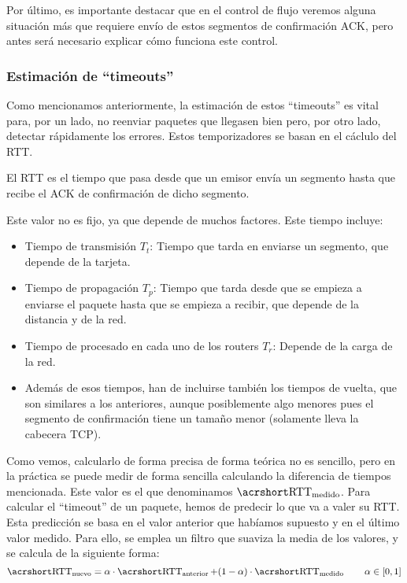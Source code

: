 Por último, es importante destacar que en el control de flujo veremos alguna situación más que requiere envío de estos segmentos de confirmación \acrshort{ACK}, pero antes será necesario explicar cómo funciona este control.

\subsubsection{Estimación de ``timeouts''}

Como mencionamos anteriormente, la estimación de estos ``timeouts'' es vital para, por un lado, no reenviar paquetes que llegasen bien pero, por otro lado, detectar rápidamente los errores. Estos temporizadores se basan en el cáclulo del \acrshort{RTT}.

\begin{definicion}
    El \acrfull{RTT} es el tiempo que pasa desde que un emisor envía un segmento hasta que recibe el \acrshort{ACK} de confirmación de dicho segmento.
\end{definicion}

Este valor no es fijo, ya que depende de muchos factores. Este tiempo incluye:
\begin{itemize}
    \item Tiempo de transmisión $T_t$: Tiempo que tarda en enviarse un segmento, que depende de la tarjeta.
    \item Tiempo de propagación $T_p$: Tiempo que tarda desde que se empieza a enviarse el paquete hasta que se empieza a recibir, que depende de la distancia y de la red.
    \item Tiempo de procesado en cada uno de los routers $T_r$: Depende de la carga de la red.
    \item Además de esos tiempos, han de incluirse también los tiempos de vuelta, que son similares a los anteriores, aunque posiblemente algo menores pues el segmento de confirmación tiene un tamaño menor (solamente lleva la cabecera \acrshort{TCP}).
\end{itemize}

Como vemos, calcularlo de forma precisa de forma teórica no es sencillo, pero en la práctica se puede medir de forma sencilla calculando la diferencia de tiempos mencionada. Este valor es el que denominamos $\rtt_{\text{medido}}$. Para calcular el ``timeout'' de un paquete, hemos de predecir lo que va a valer su \acrshort{RTT}. Esta predicción se basa en el valor anterior que habíamos supuesto y en el último valor medido. Para ello, se emplea un filtro que suaviza la media de los valores, y se calcula de la siguiente forma:
\begin{equation*}
    \rtt_{\text{nuevo}} = \alpha \cdot \rtt_{\text{anterior}} + (1-\alpha) \cdot \rtt_{\text{medido}}
    \qquad \alpha \in [0,1]
\end{equation*}

